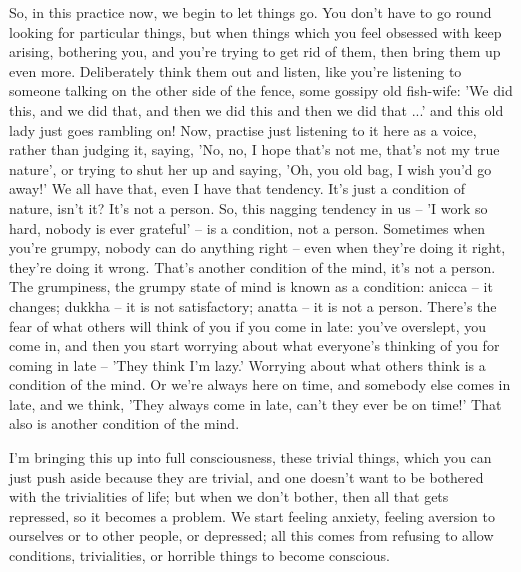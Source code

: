 So, in this practice now, we begin to let things go. You don't have to go round looking for particular things, but when things which you feel obsessed with keep arising, bothering you, and you're trying to get rid of them, then bring them up even more. Deliberately think them out and listen, like you're listening to someone talking on the other side of the fence, some gossipy old fish-wife: 'We did this, and we did that, and then we did this and then we did that ...' and this old lady just goes rambling on! Now, practise just listening to it here as a voice, rather than judging it, saying, 'No, no, I hope that's not me, that's not my true nature', or trying to shut her up and saying, 'Oh, you old bag, I wish you'd go away!' We all have that, even I have that tendency. It's just a condition of nature, isn't it? It's not a person. So, this nagging tendency in us -- 'I work so hard, nobody is ever grateful' -- is a condition, not a person. Sometimes when you're grumpy, nobody can do anything right -- even when they're doing it right, they're doing it wrong. That's another condition of the mind, it's not a person. The grumpiness, the grumpy state of mind is known as a condition: anicca -- it changes; dukkha -- it is not satisfactory; anatta -- it is not a person. There's the fear of what others will think of you if you come in late: you've overslept, you come in, and then you start worrying about what everyone's thinking of you for coming in late -- 'They think I'm lazy.' Worrying about what others think is a condition of the mind. Or we're always here on time, and somebody else comes in late, and we think, 'They always come in late, can't they ever be on time!' That also is another condition of the mind.

I'm bringing this up into full consciousness, these trivial things, which you can just push aside because they are trivial, and one doesn't want to be bothered with the trivialities of life; but when we don't bother, then all that gets repressed, so it becomes a problem. We start feeling anxiety, feeling aversion to ourselves or to other people, or depressed; all this comes from refusing to allow conditions, trivialities, or horrible things to become conscious.

